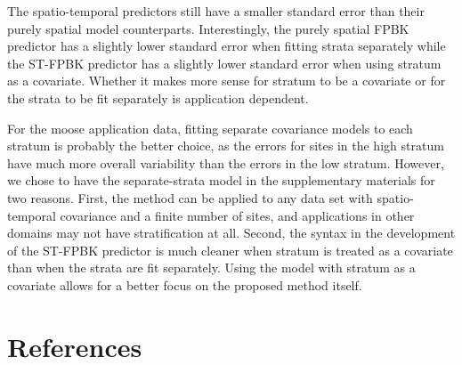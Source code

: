 \documentclass[]{article}    %
\begin{document}
The spatio-temporal predictors still have a smaller standard error than
their purely spatial model counterparts. Interestingly, the purely
spatial FPBK predictor has a slightly lower standard error when fitting
strata separately while the ST-FPBK predictor has a slightly lower
standard error when using stratum as a covariate. Whether it makes more
sense for stratum to be a covariate or for the strata to be fit
separately is application dependent.

For the moose application data, fitting separate covariance models to
each stratum is probably the better choice, as the errors for sites in
the high stratum have much more overall variability than the errors in
the low stratum. However, we chose to have the separate-strata model in
the supplementary materials for two reasons. First, the method can be
applied to any data set with spatio-temporal covariance and a finite
number of sites, and applications in other domains may not have
stratification at all. Second, the syntax in the development of the
ST-FPBK predictor is much cleaner when stratum is treated as a covariate
than when the strata are fit separately. Using the model with stratum as
a covariate allows for a better focus on the proposed method itself.

\hypertarget{references}{%
\section*{References}\label{references}}
\end{document}
